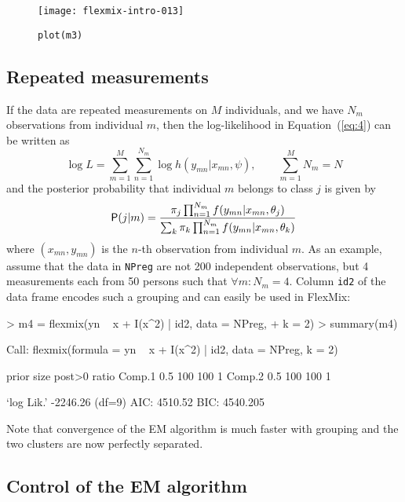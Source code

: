 \documentclass{jss}
\begin{document}
\begin{figure}[htbp]
  \centering
\texttt{[image: flexmix-intro-013]}
  \caption{\texttt{plot(m3)}}
  \label{fig:root3}
\end{figure}



\subsection{Repeated measurements}
\label{sec:repe-meas}

If the data are repeated measurements on $M$ individuals, and we have
$N_m$ observations from individual $m$, then the log-likelihood in
Equation~(\ref{eq:4}) can be written as
\begin{displaymath}
  \log L = \sum_{m=1}^M \sum_{n=1}^{N_m} \log h(y_{mn}|x_{mn},\psi),
  \qquad \sum_{m=1}^M N_m = N
\end{displaymath}
and the posterior probability that individual $m$ belongs to class
$j$ is given by
\begin{displaymath}
  \mathsf{P}(j|m) = \frac{\pi_j \prod_{n=1}^{N_m} f(y_{mn} | x_{mn}, \theta_j)}{\sum_k \pi_k \prod_{n=1}^{N_m} f(y_{mn} | x_{mn}, \theta_k)}
\end{displaymath}
where $(x_{mn}, y_{mn})$ is the $n$-th observation from individual $m$.
As an example, assume that the data in \texttt{NPreg} are not 200
independent observations, but 4 measurements each from 50 persons such
that $\forall m: N_m=4$.  Column \texttt{id2} of the data frame
encodes such a grouping and can easily be used in FlexMix:

\begin{Schunk}
\begin{Sinput}
> m4 = flexmix(yn ~ x + I(x^2) | id2, data = NPreg, 
+     k = 2)
> summary(m4)
\end{Sinput}
\begin{Soutput}
Call:
flexmix(formula = yn ~ x + I(x^2) | id2, data = NPreg, 
    k = 2)

       prior size post>0 ratio
Comp.1   0.5  100    100     1
Comp.2   0.5  100    100     1

`log Lik.' -2246.26 (df=9)
AIC: 4510.52   BIC: 4540.205 
\end{Soutput}
\end{Schunk}
Note that convergence of the EM algorithm is much faster with
grouping and the two clusters are now perfectly separated.



\subsection{Control of the EM algorithm}
\label{sec:control-em-algorithm}
\end{document}
